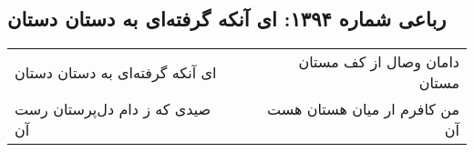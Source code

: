 \begin{center}
\section*{رباعی شماره ۱۳۹۴: ای آنکه گرفته‌ای به دستان دستان}
\label{sec:1394}
\begin{longtable}{l p{0.5cm} r}
ای آنکه گرفته‌ای به دستان دستان
&&
دامان وصال از کف مستان مستان
\\
صیدی که ز دام دل‌پرستان رست آن
&&
من کافرم ار میان هستان هست آن
\\
\end{longtable}
\end{center}
